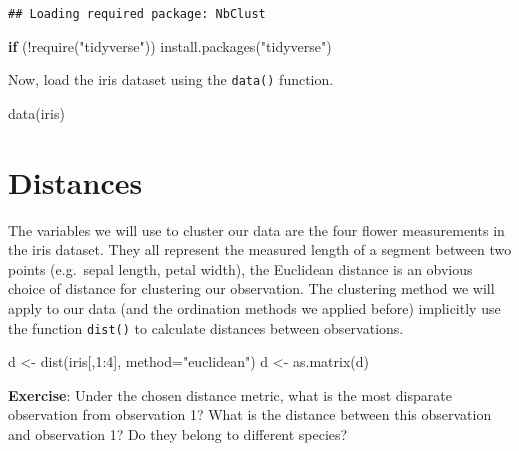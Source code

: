 \documentclass[
]{book}
\newenvironment{Shaded}{\begin{snugshade}}{\end{snugshade}}
\newcommand{\AttributeTok}[1]{\textcolor[rgb]{0.77,0.63,0.00}{#1}}
\newcommand{\ControlFlowTok}[1]{\textcolor[rgb]{0.13,0.29,0.53}{\textbf{#1}}}
\newcommand{\DecValTok}[1]{\textcolor[rgb]{0.00,0.00,0.81}{#1}}
\newcommand{\FunctionTok}[1]{\textcolor[rgb]{0.00,0.00,0.00}{#1}}
\newcommand{\NormalTok}[1]{#1}
\newcommand{\OtherTok}[1]{\textcolor[rgb]{0.56,0.35,0.01}{#1}}
\newcommand{\SpecialCharTok}[1]{\textcolor[rgb]{0.00,0.00,0.00}{#1}}
\newcommand{\StringTok}[1]{\textcolor[rgb]{0.31,0.60,0.02}{#1}}
\begin{document}
\begin{verbatim}
## Loading required package: NbClust
\end{verbatim}

\begin{Shaded}
\begin{Highlighting}[]
\ControlFlowTok{if}\NormalTok{ (}\SpecialCharTok{!}\FunctionTok{require}\NormalTok{(}\StringTok{"tidyverse"}\NormalTok{)) }\FunctionTok{install.packages}\NormalTok{(}\StringTok{"tidyverse"}\NormalTok{)}
\end{Highlighting}
\end{Shaded}

Now, load the iris dataset using the \texttt{data()} function.

\begin{Shaded}
\begin{Highlighting}[]
\FunctionTok{data}\NormalTok{(iris)}
\end{Highlighting}
\end{Shaded}

\hypertarget{distances}{%
\section{Distances}\label{distances}}

The variables we will use to cluster our data are the four flower measurements in the iris dataset. They all represent the measured length of a segment between two points (e.g.~sepal length, petal width), the Euclidean distance is an obvious choice of distance for clustering our observation. The clustering method we will apply to our data (and the ordination methods we applied before) implicitly use the function \texttt{dist()} to calculate distances between observations.

\begin{Shaded}
\begin{Highlighting}[]
\NormalTok{d }\OtherTok{\textless{}{-}} \FunctionTok{dist}\NormalTok{(iris[,}\DecValTok{1}\SpecialCharTok{:}\DecValTok{4}\NormalTok{], }\AttributeTok{method=}\StringTok{"euclidean"}\NormalTok{)}
\NormalTok{d }\OtherTok{\textless{}{-}} \FunctionTok{as.matrix}\NormalTok{(d)}
\end{Highlighting}
\end{Shaded}

\textbf{Exercise}: Under the chosen distance metric, what is the most disparate observation from observation 1? What is the distance between this observation and observation 1? Do they belong to different species?
\end{document}
